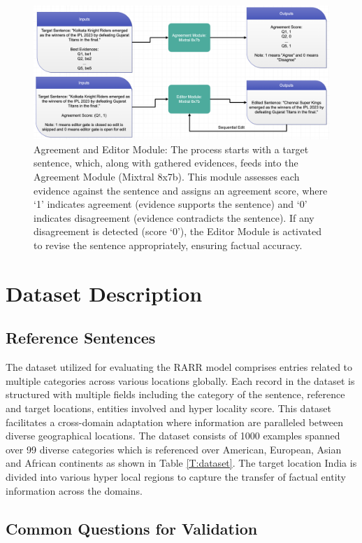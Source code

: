 \documentclass[11pt]{article}
\begin{document}
	\begin{figure}[tbh]
		\centering
		\includegraphics[width=\textwidth]{module56}
		\caption{Agreement and Editor Module: The process starts with a target sentence, which, along with gathered evidences, feeds into the Agreement Module (Mixtral 8x7b). This module assesses each evidence against the sentence and assigns an agreement score, where `1' indicates agreement (evidence supports the sentence) and `0' indicates disagreement (evidence contradicts the sentence). If any disagreement is detected (score `0'), the Editor Module is activated to revise the sentence appropriately, ensuring factual accuracy.}
		\label{F:module56}
	\end{figure}
	
	\section{Dataset Description}
	\subsection{Reference Sentences}
	
	The dataset utilized for evaluating the RARR model comprises entries related to multiple categories across various locations globally. Each record in the dataset is structured with multiple fields including the category of the sentence, reference and target locations, entities involved and hyper locality score. This dataset facilitates a cross-domain adaptation where information are paralleled between diverse geographical locations. The dataset consists of 1000 examples spanned over 99 diverse categories which is referenced over American, European, Asian and African continents as shown in Table \ref{T:dataset}. The target location India is divided into various hyper local regions to capture the transfer of factual entity information across the domains.
	
	\subsection{Common Questions for Validation}
	
\end{document}
